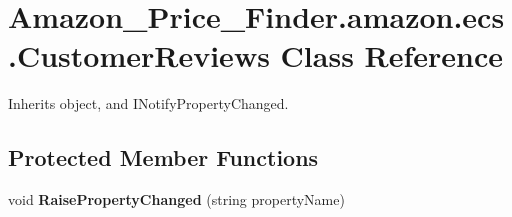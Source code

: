 \hypertarget{class_amazon___price___finder_1_1amazon_1_1ecs_1_1_customer_reviews}{\section{Amazon\-\_\-\-Price\-\_\-\-Finder.\-amazon.\-ecs.\-Customer\-Reviews Class Reference}
\label{class_amazon___price___finder_1_1amazon_1_1ecs_1_1_customer_reviews}
}


 




Inherits object, and I\-Notify\-Property\-Changed.

\subsection*{Protected Member Functions}
\begin{DoxyCompactItemize}
\item 
\hypertarget{class_amazon___price___finder_1_1amazon_1_1ecs_1_1_customer_reviews_a85891f2370a2b52ad17f11fb10508fef}{void {\bfseries Raise\-Property\-Changed} (string property\-Name)}\label{class_amazon___price___finder_1_1amazon_1_1ecs_1_1_customer_reviews_a85891f2370a2b52ad17f11fb10508fef}

\end{DoxyCompactItemize}
